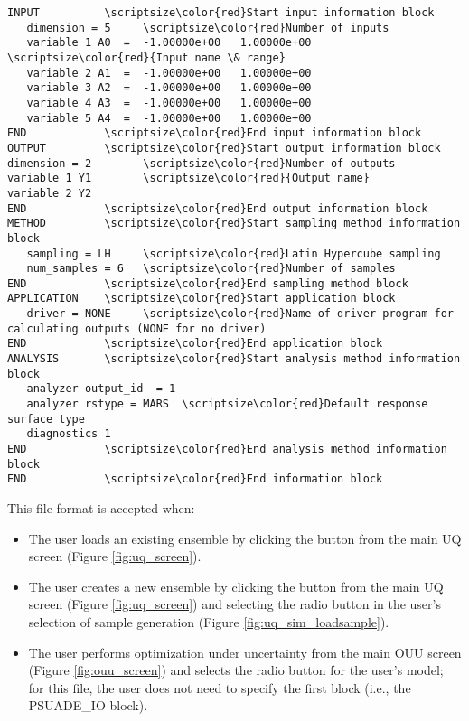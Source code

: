 \begin{Verbatim}[commandchars=\\\{\}]
INPUT          \scriptsize\color{red}Start input information block
   dimension = 5     \scriptsize\color{red}Number of inputs
   variable 1 A0  =  -1.00000e+00   1.00000e+00  \scriptsize\color{red}{Input name \& range}
   variable 2 A1  =  -1.00000e+00   1.00000e+00
   variable 3 A2  =  -1.00000e+00   1.00000e+00
   variable 4 A3  =  -1.00000e+00   1.00000e+00
   variable 5 A4  =  -1.00000e+00   1.00000e+00
END            \scriptsize\color{red}End input information block
OUTPUT         \scriptsize\color{red}Start output information block
dimension = 2        \scriptsize\color{red}Number of outputs
variable 1 Y1        \scriptsize\color{red}{Output name}
variable 2 Y2
END            \scriptsize\color{red}End output information block
METHOD         \scriptsize\color{red}Start sampling method information block
   sampling = LH     \scriptsize\color{red}Latin Hypercube sampling
   num_samples = 6   \scriptsize\color{red}Number of samples
END            \scriptsize\color{red}End sampling method block
APPLICATION    \scriptsize\color{red}Start application block
   driver = NONE     \scriptsize\color{red}Name of driver program for calculating outputs (NONE for no driver)
END            \scriptsize\color{red}End application block
ANALYSIS       \scriptsize\color{red}Start analysis method information block
   analyzer output_id  = 1
   analyzer rstype = MARS  \scriptsize\color{red}Default response surface type
   diagnostics 1
END            \scriptsize\color{red}End analysis method information block
END            \scriptsize\color{red}End information block
\end{Verbatim}
\normalsize
This file format is accepted when:
\begin{itemize}
\item{The user loads an existing ensemble by clicking the  button from the main UQ screen (Figure \ref{fig:uq_screen}).}
\item{The user creates a new ensemble by clicking the  button
  from the main UQ screen (Figure \ref{fig:uq_screen}) and selecting
  the  radio button in the user's selection
  of sample generation (Figure \ref{fig:uq_sim_loadsample}).}
\item{The user performs optimization under uncertainty from the main OUU screen
  (Figure \ref{fig:ouu_screen}) and selects the 
  radio button for the user's model; for this file, the user does not need to specify
  the first block (i.e., the PSUADE\_IO block).}
\end{itemize}

